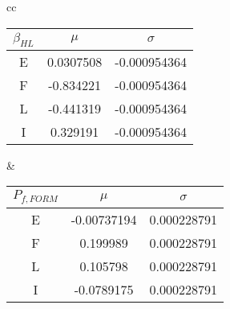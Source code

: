 {\begin{center}
\begin{tabular}{cc}
                  \begin{tabular}{|c|c|c|}
                    \hline
                    $\beta_{HL}$ & $\mu$ & $\sigma$ \\
                    \hline
                    E  & 0.0307508 & -0.000954364 \\
                    \hline
                    F  & -0.834221 &  -0.000954364 \\
                    \hline
                    L  & -0.441319 &  -0.000954364 \\
                    \hline
                    I  & 0.329191 & -0.000954364 \\
                    \hline
                  \end{tabular}
                  &
                  \begin{tabular}{|c|c|c|}
                    \hline
                    $P_{f,FORM}$ & $\mu$ & $\sigma$ \\
                    \hline
                    E  & -0.00737194  & 0.000228791 \\
                    \hline
                    F  &  0.199989 & 0.000228791  \\
                    \hline
                    L  &  0.105798 & 0.000228791   \\
                    \hline
                    I  &  -0.0789175 & 0.000228791 \\
                    \hline
                  \end{tabular}

                \end{tabular}
              \end{center}
            }
